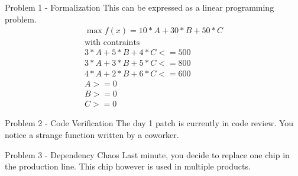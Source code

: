 \documentclass{beamer}
\begin{document}
\begin{frame}{Problem 1 - Formalization}
This can be expressed as a linear programming problem.  
\begin{align}
\max f(x) = 10 * A + 30 * B + 50 * C \\
\text{with contraints}\\
3*A + 5*B+ 4*C <= 500 \\
3*A + 3*B + 5*C <= 800 \\
4*A + 2*B + 6*C <= 600 \\
A>=0 \\
B>=0 \\
C>=0
\end{align}
\end{frame}

\begin{frame}{Problem 2 - Code Verification}
The day 1 patch is currently in code review. You notice a strange function written by a coworker.



\end{frame}

\begin{frame}{Problem 3 - Dependency Chaos}
    Last minute, you decide to replace one chip in the production line. This chip however is used in multiple products.

    
    
\end{frame}
\end{document}
